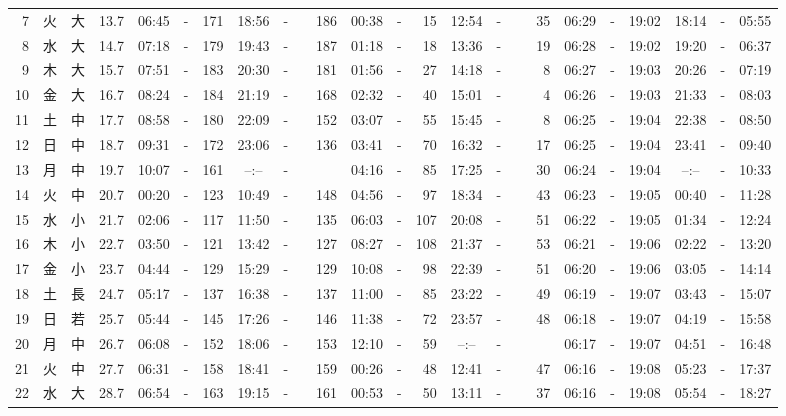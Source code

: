 \documentclass[12pt,a4j]{jsarticle}
\begin{document}
\begin{table}[htbp]
\begin{center}
{\begin{tabular}{|rc|cr|ccrccr|ccrccr|ccc|ccc|}
 7 & 火 & 大 & 13.7 &  06:45 &-& 171 &  18:56 &-& 186 &  00:38 &-&  15 &  12:54 &-&  35 & 06:29 & -& 19:02 & 18:14 & -& 05:55 \\
 8 & 水 & 大 & 14.7 &  07:18 &-& 179 &  19:43 &-& 187 &  01:18 &-&  18 &  13:36 &-&  19 & 06:28 & -& 19:02 & 19:20 & -& 06:37 \\
 9 & 木 & 大 & 15.7 &  07:51 &-& 183 &  20:30 &-& 181 &  01:56 &-&  27 &  14:18 &-&   8 & 06:27 & -& 19:03 & 20:26 & -& 07:19 \\
10 & 金 & 大 & 16.7 &  08:24 &-& 184 &  21:19 &-& 168 &  02:32 &-&  40 &  15:01 &-&   4 & 06:26 & -& 19:03 & 21:33 & -& 08:03 \\
11 & 土 & 中 & 17.7 &  08:58 &-& 180 &  22:09 &-& 152 &  03:07 &-&  55 &  15:45 &-&   8 & 06:25 & -& 19:04 & 22:38 & -& 08:50 \\
12 & 日 & 中 & 18.7 &  09:31 &-& 172 &  23:06 &-& 136 &  03:41 &-&  70 &  16:32 &-&  17 & 06:25 & -& 19:04 & 23:41 & -& 09:40 \\
13 & 月 & 中 & 19.7 &  10:07 &-& 161 &  --:-- &-&~~~~~ &  04:16 &-&  85 &  17:25 &-&  30 & 06:24 & -& 19:04 & --:-- & -& 10:33 \\
14 & 火 & 中 & 20.7 &  00:20 &-& 123 &  10:49 &-& 148 &  04:56 &-&  97 &  18:34 &-&  43 & 06:23 & -& 19:05 & 00:40 & -& 11:28 \\
15 & 水 & 小 & 21.7 &  02:06 &-& 117 &  11:50 &-& 135 &  06:03 &-& 107 &  20:08 &-&  51 & 06:22 & -& 19:05 & 01:34 & -& 12:24 \\
16 & 木 & 小 & 22.7 &  03:50 &-& 121 &  13:42 &-& 127 &  08:27 &-& 108 &  21:37 &-&  53 & 06:21 & -& 19:06 & 02:22 & -& 13:20 \\
17 & 金 & 小 & 23.7 &  04:44 &-& 129 &  15:29 &-& 129 &  10:08 &-&  98 &  22:39 &-&  51 & 06:20 & -& 19:06 & 03:05 & -& 14:14 \\
18 & 土 & 長 & 24.7 &  05:17 &-& 137 &  16:38 &-& 137 &  11:00 &-&  85 &  23:22 &-&  49 & 06:19 & -& 19:07 & 03:43 & -& 15:07 \\
19 & 日 & 若 & 25.7 &  05:44 &-& 145 &  17:26 &-& 146 &  11:38 &-&  72 &  23:57 &-&  48 & 06:18 & -& 19:07 & 04:19 & -& 15:58 \\
20 & 月 & 中 & 26.7 &  06:08 &-& 152 &  18:06 &-& 153 &  12:10 &-&  59 &  --:-- &-&~~~~~ & 06:17 & -& 19:07 & 04:51 & -& 16:48 \\
21 & 火 & 中 & 27.7 &  06:31 &-& 158 &  18:41 &-& 159 &  00:26 &-&  48 &  12:41 &-&  47 & 06:16 & -& 19:08 & 05:23 & -& 17:37 \\
22 & 水 & 大 & 28.7 &  06:54 &-& 163 &  19:15 &-& 161 &  00:53 &-&  50 &  13:11 &-&  37 & 06:16 & -& 19:08 & 05:54 & -& 18:27 \\

\end{tabular}}
\end{center}
\end{table}
\end{document}
